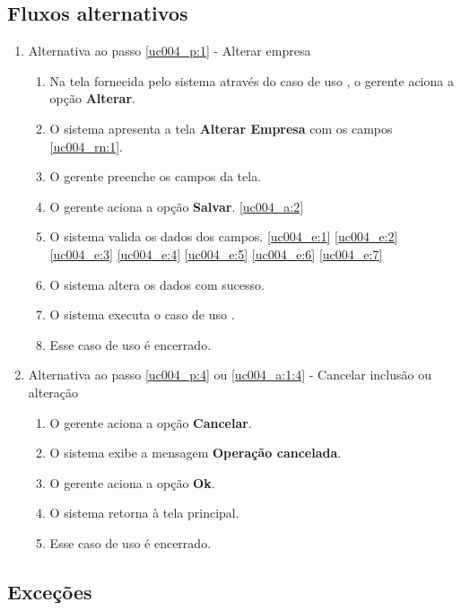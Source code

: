 \subsection{Fluxos alternativos}

\begin{enumerate}[label=A\arabic*]
	\item Alternativa ao passo \ref{uc004_p:1} - Alterar empresa \label{uc004_a:1}
	\begin{enumerate}[label*=.\arabic*]
		\item Na tela fornecida pelo sistema através do caso de uso , o gerente aciona a opção \textbf{Alterar}. 
		\item O sistema apresenta a tela \textbf{Alterar Empresa} com os campos \ref{uc004_rn:1}. \label{uc004_a:1:2}
		\item O gerente preenche os campos da tela. \label{uc004_a:1:3}
		\item O gerente aciona a opção \textbf{Salvar}. \label{uc004_a:1:4}\ref{uc004_a:2}
		\item O sistema valida os dados dos campos. \ref{uc004_e:1} \ref{uc004_e:2} \ref{uc004_e:3} \ref{uc004_e:4} \ref{uc004_e:5} \ref{uc004_e:6} \ref{uc004_e:7}
		\item O sistema altera os dados com sucesso.
		\item O sistema executa o caso de uso .
		\item Esse caso de uso é encerrado.
	\end{enumerate}
	
	\item Alternativa ao passo \ref{uc004_p:4} ou \ref{uc004_a:1:4} - Cancelar inclusão ou alteração \label{uc004_a:2}
	\begin{enumerate}[label*=.\arabic*]
		\item O gerente aciona a opção \textbf{Cancelar}.
		\item O sistema exibe a mensagem \textbf{Operação cancelada}.
		\item O gerente aciona a opção \textbf{Ok}.
		\item O sistema retorna à tela principal.
		\item Esse caso de uso é encerrado.
	\end{enumerate}	 	
\end{enumerate}

\subsection{Exceções}


